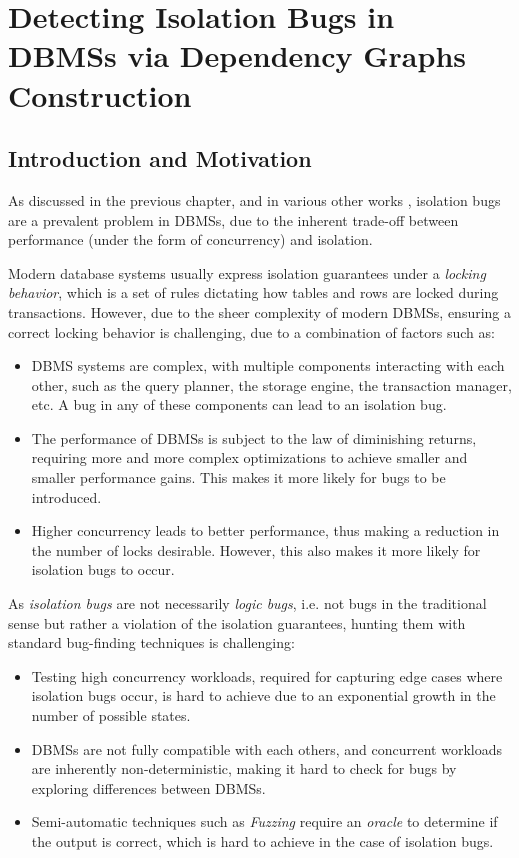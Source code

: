 \chapter{Detecting Isolation Bugs in DBMSs via Dependency Graphs Construction}

\section{Introduction and Motivation}

As discussed in the previous chapter, and in various other works \cite{jiang2023detecting,cui2024understanding_ICSE2024,dou2023detecting_ICSE2023,clark2024validating,cui2022differentially_ASE2022}, isolation bugs are a prevalent problem in DBMSs, due to the inherent trade-off between performance (under the form of concurrency) and isolation.

Modern database systems usually express isolation guarantees under a \textit{locking behavior}, which is a set of rules dictating how tables and rows are locked during transactions. However, due to the sheer complexity of modern DBMSs, ensuring a correct locking behavior is challenging, due to a combination of factors such as:

\begin{itemize}
    \item DBMS systems are complex, with multiple components interacting with each other, such as the query planner, the storage engine, the transaction manager, etc. A bug in any of these components can lead to an isolation bug.
    \item The performance of DBMSs is subject to the law of diminishing returns, requiring more and more complex optimizations to achieve smaller and smaller performance gains. This makes it more likely for bugs to be introduced.
    \item Higher concurrency leads to better performance, thus making a reduction in the number of locks desirable. However, this also makes it more likely for isolation bugs to occur.
\end{itemize}

As \textit{isolation bugs} are not necessarily \textit{logic bugs}, i.e. not bugs in the traditional sense but rather a violation of the isolation guarantees, hunting them with standard bug-finding techniques is challenging:

\begin{itemize}
    \item Testing high concurrency workloads, required for capturing edge cases where isolation bugs occur, is hard to achieve due to an exponential growth in the number of possible states.
    \item DBMSs are not fully compatible with each others, and concurrent workloads are inherently non-deterministic, making it hard to check for bugs by exploring differences between DBMSs.
    \item Semi-automatic techniques such as \textit{Fuzzing} require an \textit{oracle} to determine if the output is correct, which is hard to achieve in the case of isolation bugs.
\end{itemize}

